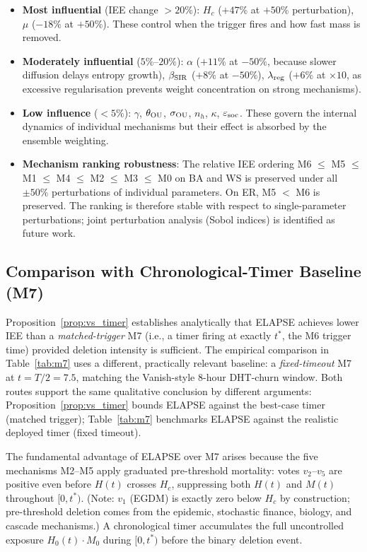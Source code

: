 \documentclass[review,12pt]{elsarticle}
\newcommand{\Hc}{H_c}
\begin{document}
\begin{itemize}
  \item \textbf{Most influential} (IEE change $> 20\%$): $\Hc$ ($+47\%$ at
    $+50\%$ perturbation), $\mu$ ($-18\%$ at $+50\%$).
    These control when the trigger fires and how fast mass is removed.
  \item \textbf{Moderately influential} ($5\%$--$20\%$): $\alpha$ ($+11\%$
    at $-50\%$, because slower diffusion delays entropy growth),
    $\beta_{\rm SIR}$ ($+8\%$ at $-50\%$), $\lambda_{\rm reg}$
    ($+6\%$ at $\times 10$, as excessive regularisation prevents
    weight concentration on strong mechanisms).
  \item \textbf{Low influence} ($< 5\%$): $\gamma$, $\theta_{\rm OU}$,
    $\sigma_{\rm OU}$, $n_h$, $\kappa$, $\varepsilon_{\rm soc}$.
    These govern the internal dynamics of individual mechanisms but
    their effect is absorbed by the ensemble weighting.
  \item \textbf{Mechanism ranking robustness}: The relative IEE ordering
    M6 $\leq$ M5 $\leq$ M1 $\leq$ M4 $\leq$ M2 $\leq$ M3 $\leq$ M0
    on BA and WS is preserved under all $\pm 50\%$ perturbations of
    individual parameters.  On ER, M5 $<$ M6 is preserved.
    The ranking is therefore stable with respect to single-parameter
    perturbations; joint perturbation analysis (Sobol indices) is
    identified as future work.
\end{itemize}

\subsection{Comparison with Chronological-Timer Baseline (M7)}
\label{sec:m7_comparison}

Proposition~\ref{prop:vs_timer} establishes analytically that ELAPSE achieves
lower IEE than a \emph{matched-trigger} M7 (i.e., a timer firing at exactly
$t^*$, the M6 trigger time) provided deletion intensity is sufficient.
The empirical comparison in Table~\ref{tab:m7} uses a different, practically
relevant baseline: a \emph{fixed-timeout} M7 at $t = T/2 = 7.5$, matching
the Vanish-style 8-hour DHT-churn window.
Both routes support the same qualitative conclusion by different arguments:
Proposition~\ref{prop:vs_timer} bounds ELAPSE against the best-case timer
(matched trigger); Table~\ref{tab:m7} benchmarks ELAPSE against the realistic
deployed timer (fixed timeout).

The fundamental advantage of ELAPSE over M7 arises because the five
mechanisms M2--M5 apply graduated pre-threshold mortality: votes $v_2$--$v_5$
are positive even before $H(t)$ crosses $\Hc$, suppressing both $H(t)$ and
$M(t)$ throughout $[0, t^*)$.  (Note: $v_1$ (EGDM) is exactly zero below $\Hc$
by construction; pre-threshold deletion comes from the epidemic, stochastic
finance, biology, and cascade mechanisms.)  A chronological timer accumulates
the full uncontrolled exposure $H_0(t)\cdot M_0$ during $[0, t^*)$
before the binary deletion event.
\end{document}
